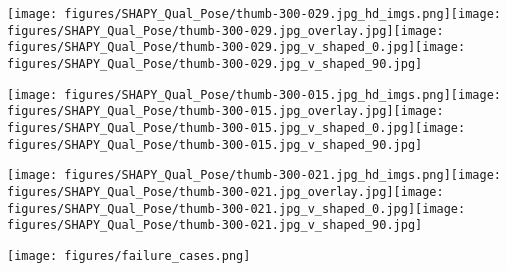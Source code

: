 \documentclass[10pt,twocolumn,letterpaper]{article}
\newcommand{\modelCOLOR}{black}
\newcommand{\modelname}{{\color{\modelCOLOR}SHAPY}\xspace}
\newcommand{\bmi}{\mbox{BMI}\xspace}
\newcommand{\cameraready}[1]{\textcolor{Fuchsia}{{#1}}\xspace}
\renewcommand{\cameraready}[1]{\textcolor{black}{{#1}}\xspace}
\begin{document}
\begin{appendices}
\begin{figure*}
        \texttt{[image: figures/SHAPY\_Qual\_Pose/thumb-300-029.jpg\_hd\_imgs.png]}\texttt{[image: figures/SHAPY\_Qual\_Pose/thumb-300-029.jpg\_overlay.jpg]}\texttt{[image: figures/SHAPY\_Qual\_Pose/thumb-300-029.jpg\_v\_shaped\_0.jpg]}\texttt{[image: figures/SHAPY\_Qual\_Pose/thumb-300-029.jpg\_v\_shaped\_90.jpg]}
        
    \caption{Qualitative results of \modelname predictions for male bodies.}
\end{figure*}
\begin{figure*}
    \centering
        \texttt{[image: figures/SHAPY\_Qual\_Pose/thumb-300-015.jpg\_hd\_imgs.png]}\texttt{[image: figures/SHAPY\_Qual\_Pose/thumb-300-015.jpg\_overlay.jpg]}\texttt{[image: figures/SHAPY\_Qual\_Pose/thumb-300-015.jpg\_v\_shaped\_0.jpg]}\texttt{[image: figures/SHAPY\_Qual\_Pose/thumb-300-015.jpg\_v\_shaped\_90.jpg]}
        
        \texttt{[image: figures/SHAPY\_Qual\_Pose/thumb-300-021.jpg\_hd\_imgs.png]}\texttt{[image: figures/SHAPY\_Qual\_Pose/thumb-300-021.jpg\_overlay.jpg]}\texttt{[image: figures/SHAPY\_Qual\_Pose/thumb-300-021.jpg\_v\_shaped\_0.jpg]}\texttt{[image: figures/SHAPY\_Qual\_Pose/thumb-300-021.jpg\_v\_shaped\_90.jpg]}
    
    \vspace{-0.5em}
    \caption{Qualitative results of \modelname predictions for male bodies (Cont.) .}
    \label{fig:shapy_qual_pose_male}
\end{figure*} 
\begin{figure*}[t]
    \centering
    \texttt{[image: figures/failure\_cases.png]}
    \caption{Failure cases. In the first example (upper left)
    \cameraready{the weight is underestimated}.
    Other failure cases of \modelname are
    muscular bodies (upper right) and 
    body shapes with high \bmi (second row).}
    \label{fig:failur_cases}
\end{figure*}
     



 
\end{appendices}
\end{document}
